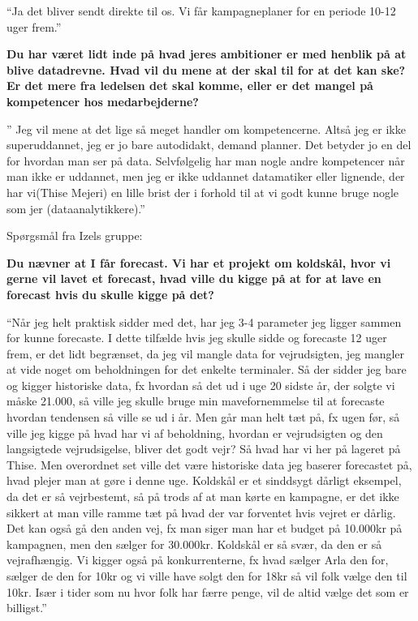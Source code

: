 \documentclass[
  12pt,
  a4paper,
  DIV=11,
  numbers=noendperiod]{scrartcl}
\begin{document}
\begin{itemize}
  ``Ja det bliver sendt direkte til os. Vi får kampagneplaner for en
  periode 10-12 uger frem.''~

  \textbf{Du har været lidt inde på hvad jeres ambitioner er med henblik
  på at blive datadrevne. Hvad vil du mene at der skal til for at det
  kan ske? Er det mere fra ledelsen det skal komme, eller er det mangel
  på kompetencer hos medarbejderne?}~

  '' Jeg vil mene at det lige så meget handler om kompetencerne. Altså
  jeg er ikke superuddannet, jeg er jo bare autodidakt, demand planner.
  Det betyder jo en del for hvordan man ser på data. Selvfølgelig har
  man nogle andre kompetencer når man ikke er uddannet, men jeg er ikke
  uddannet datamatiker eller lignende, der har vi(Thise Mejeri) en lille
  brist der i forhold til at vi godt kunne bruge nogle som jer
  (dataanalytikkere).''~

  Spørgsmål fra Izels gruppe:~~

  \textbf{Du nævner at I får forecast. Vi har et projekt om koldskål,
  hvor vi gerne vil lavet et forecast, hvad ville du kigge på at for at
  lave en forecast hvis du skulle kigge på det?}~

  ``Når jeg helt praktisk sidder med det, har jeg 3-4 parameter jeg
  ligger sammen for kunne forecaste. I dette tilfælde hvis jeg skulle
  sidde og forecaste 12 uger frem, er det lidt begrænset, da jeg vil
  mangle data for vejrudsigten, jeg mangler at vide noget om
  beholdningen for det enkelte terminaler. Så der sidder jeg bare og
  kigger historiske data, fx hvordan så det ud i uge 20 sidste år, der
  solgte vi måske 21.000, så ville jeg skulle bruge min mavefornemmelse
  til at forecaste hvordan tendensen så ville se ud i år. Men går man
  helt tæt på, fx ugen før, så ville jeg kigge på hvad har vi af
  beholdning, hvordan er vejrudsigten og den langsigtede vejrudsigelse,
  bliver det godt vejr? Så hvad har vi her på lageret på Thise. Men
  overordnet set ville det være historiske data jeg baserer forecastet
  på, hvad plejer man at gøre i denne uge. Koldskål er et sinddsygt
  dårligt eksempel, da det er så vejrbestemt, så på trods af at man
  kørte en kampagne, er det ikke sikkert at man ville ramme tæt på hvad
  der var forventet hvis vejret er dårlig. Det kan også gå den anden
  vej, fx man siger man har et budget på 10.000kr på kampagnen, men den
  sælger for 30.000kr. Koldskål er så svær, da den er så vejrafhængig.
  Vi kigger også på konkurrenterne, fx hvad sælger Arla den for, sælger
  de den for 10kr og vi ville have solgt den for 18kr så vil folk vælge
  den til 10kr. Især i tider som nu hvor folk har færre penge, vil de
  altid vælge det som er billigst.''~


\end{itemize}
\end{document}
